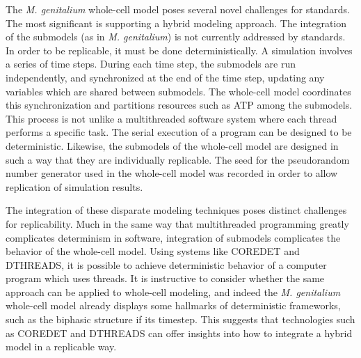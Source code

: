 \documentclass[journal,transmag,twoside]{IEEEtran}
\begin{document}
The \textit{M. genitalium} whole-cell model poses several novel challenges for standards.
The most significant is supporting a hybrid modeling approach.
The integration of the submodels (as in \textit{M. genitalium}) is not currently
addressed by standards. In order to be replicable, it must be done deterministically.
A simulation involves a series of time steps. During each time step, the
submodels are run independently,
and synchronized at the end of the time step, updating any variables
which are shared between submodels.
The whole-cell model coordinates this synchronization and partitions resources such as ATP
among the submodels.
This process is not unlike a multithreaded software system where each thread performs
a specific task. The serial execution of a program can be designed to be deterministic.
Likewise, the submodels of the whole-cell model are designed in such a way that
they are individually replicable. The seed for the pseudorandom number generator
used in the whole-cell model was recorded in order to allow replication of simulation results.

The integration of these disparate modeling techniques poses distinct challenges for replicability.
Much in the same way that multithreaded programming greatly complicates
determinism in software, integration of submodels complicates the behavior
of the whole-cell model.
Using systems like C{\small ORE}D{\small ET} and D{\small THREADS}, it is possible
to achieve deterministic behavior of a computer program which uses threads.
It is instructive to consider whether the same approach can be applied to whole-cell
modeling, and indeed the \textit{M. genitalium} whole-cell model already displays
some hallmarks of deterministic frameworks, such as the biphasic structure if its timestep.
This suggests that technologies such as C{\small ORE}D{\small ET} and D{\small THREADS}
can offer insights into how to integrate a hybrid model in a replicable way.

\end{document}
